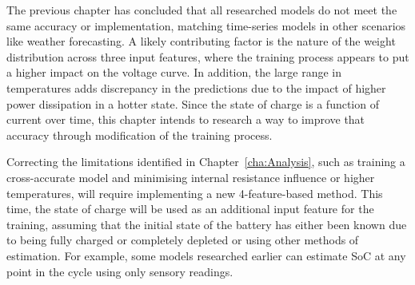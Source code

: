 The previous chapter has concluded that all researched models do not meet the same accuracy or implementation, matching time-series models in other scenarios like weather forecasting.
A likely contributing factor is the nature of the weight distribution across three input features, where the training process appears to put a higher impact on the voltage curve.
In addition, the large range in temperatures adds discrepancy in the predictions due to the impact of higher power dissipation in a hotter state.
Since the state of charge is a function of current over time, this chapter intends to research a way to improve that accuracy through modification of the training process.


%
%
Correcting the limitations identified in Chapter~\ref{cha:Analysis}, such as training a cross-accurate model and minimising internal resistance influence or higher temperatures, will require implementing a new 4-feature-based method.
This time, the state of charge will be used as an additional input feature for the training, assuming that the initial state of the battery has either been known due to being fully charged or completely depleted or using other methods of estimation.
For example, some models researched earlier can estimate SoC at any point in the cycle using only sensory readings.

